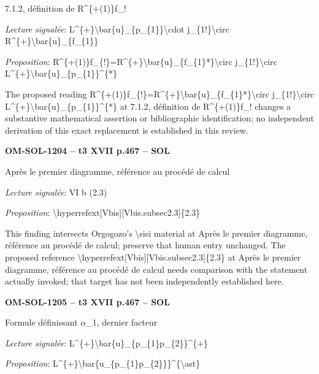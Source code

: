 7.1.2, définition de R\textasciicircum{}\{+(1)\}f\_!\par
\emph{Lecture signalée}: L\textasciicircum{}\{+\}\textbackslash{}bar\{u\}\_\{p\_\{1\}\}\textbackslash{}cdot j\_\{1!\}\textbackslash{}circ R\textasciicircum{}\{+\}\textbackslash{}bar\{u\}\_\{f\_\{1\}\}\par
\emph{Proposition}: R\textasciicircum{}\{+(1)\}f\_\{!\}=\allowbreak R\textasciicircum{}\{+\}\textbackslash{}bar\{u\}\_\{f\_\{1\}*\}\textbackslash{}circ j\_\{1!\}\textbackslash{}circ L\textasciicircum{}\{+\}\textbackslash{}bar\{u\}\_\{p\_\{1\}\}\textasciicircum{}\{*\}\par
The proposed reading R\textasciicircum{}\{+(1)\}f\_\{!\}=\allowbreak R\textasciicircum{}\{+\}\textbackslash{}bar\{u\}\_\{f\_\{1\}*\}\textbackslash{}circ j\_\{1!\}\textbackslash{}circ L\textasciicircum{}\{+\}\textbackslash{}bar\{u\}\_\{p\_\{1\}\}\textasciicircum{}\{*\} at 7.1.2, définition de R\textasciicircum{}\{+(1)\}f\_! changes a substantive mathematical assertion or bibliographic identification; no independent derivation of this exact replacement is established in this review.\par
\par\noindent\textbf{OM-SOL-1204 -- t3 XVII p.467 -- SOL}\par
Après le premier diagramme, référence au procédé de calcul\par
\emph{Lecture signalée}: VI b (2.3)\par
\emph{Proposition}: \textbackslash{}hyperrefext[Vbis][Vbis.subsec2.3]\{2.3\}\par
This finding intersects Orgogozo's \textbackslash{}sisi material at Après le premier diagramme, référence au procédé de calcul; preserve that human entry unchanged. The proposed reference \textbackslash{}hyperrefext[Vbis][Vbis.subsec2.3]\{2.3\} at Après le premier diagramme, référence au procédé de calcul needs comparison with the statement actually invoked; that target has not been independently established here.\par
\par\noindent\textbf{OM-SOL-1205 -- t3 XVII p.467 -- SOL}\par
Formule définissant \ensuremath{\alpha}\_1, dernier facteur\par
\emph{Lecture signalée}: L\textasciicircum{}\{+\}\textbackslash{}bar\{u\}\_\{p\_\{1\}p\_\{2\}\}\textasciicircum{}\{+\}\par
\emph{Proposition}: L\textasciicircum{}\{+\}\textbackslash{}bar\{u\_\{p\_\{1\}p\_\{2\}\}\}\textasciicircum{}\{\textbackslash{}ast\}\par
